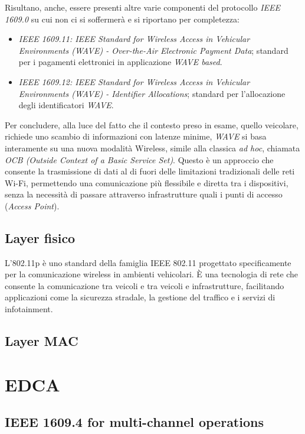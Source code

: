 Risultano, anche, essere presenti altre varie componenti del protocollo \textit{IEEE 1609.0} su cui non ci si soffermerà e si riportano per completezza:

\begin{itemize}
    \item \textit{IEEE 1609.11:  IEEE Standard for Wireless Access in Vehicular Environments (WAVE) - Over-the-Air Electronic Payment Data}; standard per i pagamenti elettronici in applicazione \textit{WAVE based}\cite{5692959}.
    \item \textit{IEEE 1609.12:  IEEE Standard for Wireless Access in Vehicular Environments (WAVE) - Identifier Allocations}; standard per l'allocazione degli identificatori \textit{WAVE}\cite{8877516}.
\end{itemize}

Per concludere, alla luce del fatto che il contesto preso in esame, quello veicolare, richiede uno scambio di informazioni con latenze minime, \textit{WAVE} si basa interamente su una nuova modalità Wireless, simile alla classica \textit{ad hoc}, chiamata \textit{OCB (Outside Context of a Basic Service Set)}. Questo è un approccio che consente la trasmissione di dati al di fuori delle limitazioni tradizionali delle reti Wi-Fi, permettendo una comunicazione più flessibile e diretta tra i dispositivi, senza la necessità di passare attraverso infrastrutture quali i punti di accesso (\textit{Access Point}).

\subsection[Layer fisico]{Layer fisico}
L'802.11p è uno standard della famiglia IEEE 802.11 progettato specificamente per la comunicazione wireless in ambienti vehicolari. È una tecnologia di rete che consente la comunicazione tra veicoli e tra veicoli e infrastrutture, facilitando applicazioni come la sicurezza stradale, la gestione del traffico e i servizi di infotainment.

\subsection[Layer MAC]{Layer MAC}

\section[EDCA]{EDCA}

\subsection[IEEE 1609.4 for multi-channel operations]{IEEE 1609.4 for multi-channel operations}